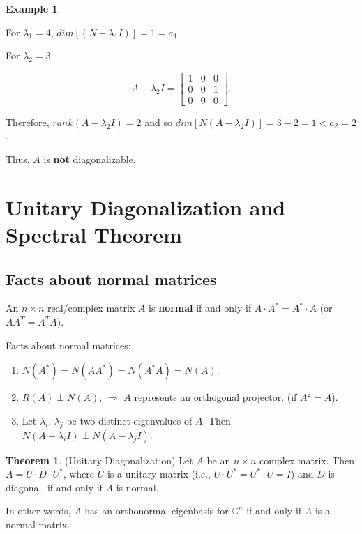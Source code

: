 \documentclass[12pt]{article}
\theoremstyle{definition}
\newtheorem*{example}{Example}
\newtheorem{theorem}{Theorem}[section]  %
\begin{document}
\begin{example}
\begin{enumerate}[label = (\arabic*)]
For $\lambda_1 = 4$, $dim[(N - \lambda_1 I)] = 1 = a_1$.

For $\lambda_2 = 3$

\[A - \lambda_2 I =
\begin{bmatrix}
1 & 0 & 0 \\
0 & 0 & 1 \\
0 & 0 & 0
\end{bmatrix}.
\]

Therefore, $rank(A - \lambda_2 I) = 2$ and so $dim[N(A - \lambda_2 I)] = 3 - 2 = 1 < a_2 = 2$.

Thus, $A$ is \textbf{not} diagonalizable.
\end{enumerate}
\end{example}

\section{Unitary Diagonalization and Spectral Theorem}

\subsection{Facts about normal matrices}

An $n \times n$ real/complex matrix $A$ is \textbf{normal} if and only if 
$A \cdot A^* = A^* \cdot A$ (or $A A^T = A^T A$).

Facts about normal matrices:

\begin{enumerate}[label = (\arabic*)]
\item $N(A^*) = N(AA^*) = N(A^* A) = N(A)$.
\item $R(A) \perp N(A)$, $\Rightarrow$ $A$ represents an orthogonal projector. (if $A^2 = A$).
\item Let $\lambda_i$, $\lambda_j$ be two distinct eigenvalues of $A$. Then
$N(A - \lambda_i I) \perp N(A - \lambda_j I)$.
\end{enumerate}

\begin{theorem} (Unitary Diagonalization)
Let $A$ be an $n \times n$ complex matrix. Then $A = U \cdot D \cdot U^*$, where $U$ is a
unitary matrix (i.e., $U \cdot U^* = U^* \cdot U = I$) and $D$ is diagonal, if and only
if $A$ is normal.

In other words, $A$ has an orthonormal eigenbasis for $\mathbb{C}^n$ if and only if
$A$ is a normal matrix.
\end{theorem}
\end{document}
